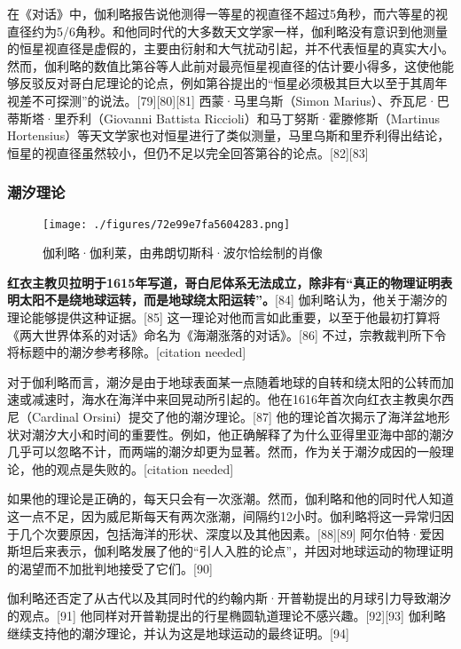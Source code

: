 在《对话》中，伽利略报告说他测得一等星的视直径不超过5角秒，而六等星的视直径约为5/6角秒。和他同时代的大多数天文学家一样，伽利略没有意识到他测量的恒星视直径是虚假的，主要由衍射和大气扰动引起，并不代表恒星的真实大小。然而，伽利略的数值比第谷等人此前对最亮恒星视直径的估计要小得多，这使他能够反驳反对哥白尼理论的论点，例如第谷提出的“恒星必须极其巨大以至于其周年视差不可探测”的说法。[79][80][81] 西蒙·马里乌斯（Simon Marius）、乔瓦尼·巴蒂斯塔·里乔利（Giovanni Battista Riccioli）和马丁努斯·霍滕修斯（Martinus Hortensius）等天文学家也对恒星进行了类似测量，马里乌斯和里乔利得出结论，恒星的视直径虽然较小，但仍不足以完全回答第谷的论点。[82][83]
\subsubsection{潮汐理论}
\begin{figure}[ht]
\centering
\texttt{[image: ./figures/72e99e7fa5604283.png]}
\caption{伽利略·伽利莱，由弗朗切斯科·波尔恰绘制的肖像} \label{fig_JLL_7}
\end{figure}
\textbf{红衣主教贝拉明于1615年写道，哥白尼体系无法成立，除非有“真正的物理证明表明太阳不是绕地球运转，而是地球绕太阳运转”。}[84] 伽利略认为，他关于潮汐的理论能够提供这种证据。[85] 这一理论对他而言如此重要，以至于他最初打算将《两大世界体系的对话》命名为《海潮涨落的对话》。[86] 不过，宗教裁判所下令将标题中的潮汐参考移除。[citation needed]

对于伽利略而言，潮汐是由于地球表面某一点随着地球的自转和绕太阳的公转而加速或减速时，海水在海洋中来回晃动所引起的。他在1616年首次向红衣主教奥尔西尼（Cardinal Orsini）提交了他的潮汐理论。[87] 他的理论首次揭示了海洋盆地形状对潮汐大小和时间的重要性。例如，他正确解释了为什么亚得里亚海中部的潮汐几乎可以忽略不计，而两端的潮汐却更为显著。然而，作为关于潮汐成因的一般理论，他的观点是失败的。[citation needed]

如果他的理论是正确的，每天只会有一次涨潮。然而，伽利略和他的同时代人知道这一点不足，因为威尼斯每天有两次涨潮，间隔约12小时。伽利略将这一异常归因于几个次要原因，包括海洋的形状、深度以及其他因素。[88][89] 阿尔伯特·爱因斯坦后来表示，伽利略发展了他的“引人入胜的论点”，并因对地球运动的物理证明的渴望而不加批判地接受了它们。[90]  

伽利略还否定了从古代以及其同时代的约翰内斯·开普勒提出的月球引力导致潮汐的观点。[91] 他同样对开普勒提出的行星椭圆轨道理论不感兴趣。[92][93] 伽利略继续支持他的潮汐理论，并认为这是地球运动的最终证明。[94]